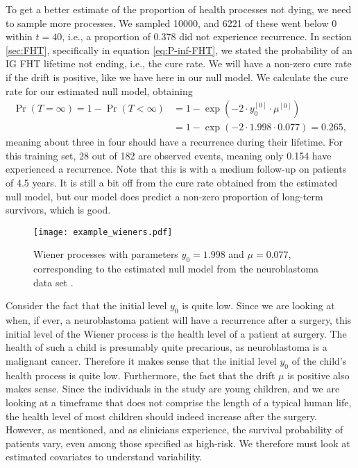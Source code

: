 To get a better estimate of the proportion of health processes not dying, we need to sample more processes.
We sampled 10000, and 6221 of these went below 0 within $t=40$, i.e., a proportion of 0.378 did not experience recurrence.
In section \ref{sec:FHT}, specifically in equation \eqref{eq:P-inf-FHT}, we stated the probability of an IG FHT lifetime not ending, i.e., the cure rate.
We will have a non-zero cure rate if the drift is positive, like we have here in our null model.
We calculate the cure rate for our estimated null model, obtaining
\begin{align*}
    \Pr{(T=\infty)}=1-\Pr{(T<\infty)}&=1-\exp{(-2\cdot y_0^{[0]}\cdot\mu^{[0]})}\\
    &=1-\exp{(-2\cdot 1.998\cdot 0.077)}=0.265,
\end{align*}
meaning about three in four should have a recurrence during their lifetime.
For this training set, 28 out of 182 are observed events, meaning only 0.154 have experienced a recurrence.
Note that this is with a medium follow-up on patients of 4.5 years.
It is still a bit off from the cure rate obtained from the estimated null model, but our model does predict a non-zero proportion of long-term survivors, which is good.
\begin{figure}
\caption{Wiener processes with parameters $y_0=1.998$ and $\mu=0.077$, corresponding to the estimated null model from the neuroblastoma data set \citep{oberthuer-data}.}
\label{fig:neuroblastoma-wien}
\centering
\texttt{[image: example\_wieners.pdf]}
\end{figure}

Consider the fact that the initial level $y_0$ is quite low.
Since we are looking at when, if ever, a neuroblastoma patient will have a recurrence after a surgery, this initial level of the Wiener process is the health level of a patient at surgery.
The health of such a child is presumably quite precarious, as neuroblastoma is a malignant cancer.
Therefore it makes sense that the initial level $y_0$ of the child's health process is quite low.
Furthermore, the fact that the drift $\mu$ is positive also makes sense.
Since the individuals in the study are young children, and we are looking at a timeframe that does not comprise the length of a typical human life, the health level of most children should indeed increase after the surgery.
However, as mentioned, and as clinicians experience, the survival probability of patients vary, even among those specified as high-risk.
We therefore must look at estimated covariates to understand variability.

